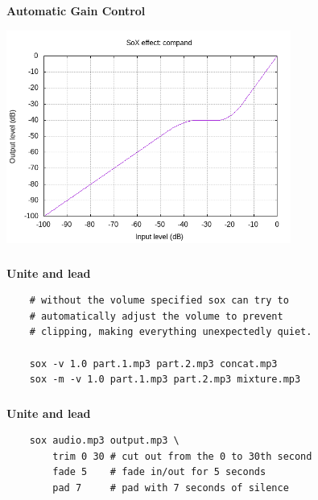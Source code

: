 \documentclass[usenames,dvipsnames, 18pt, compress, aspectratio=169]{beamer}
\begin{document}
\begin{frame}[fragile]{}
    \frametitle{}
    \begin{center}
        \textbf{Automatic Gain Control}
        \vspace{0.2cm}

        \includegraphics[width=0.7\textwidth]{agc.png}

    \end{center}
\end{frame}

\begin{frame}[fragile]{}
    \frametitle{}
    \begin{center}
        \textbf{Unite and lead}
        \vspace{0.2cm}

        \begin{verbatim}
    # without the volume specified sox can try to
    # automatically adjust the volume to prevent
    # clipping, making everything unexpectedly quiet.

    sox -v 1.0 part.1.mp3 part.2.mp3 concat.mp3
    sox -m -v 1.0 part.1.mp3 part.2.mp3 mixture.mp3
        \end{verbatim}
    \end{center}
\end{frame}

\begin{frame}[fragile]{}
    \frametitle{}
    \begin{center}
        \textbf{Unite and lead}
        \vspace{0.2cm}

        \begin{verbatim}
    sox audio.mp3 output.mp3 \
        trim 0 30 # cut out from the 0 to 30th second
        fade 5    # fade in/out for 5 seconds
        pad 7     # pad with 7 seconds of silence
        \end{verbatim}
    \end{center}
\end{frame}
\end{document}
